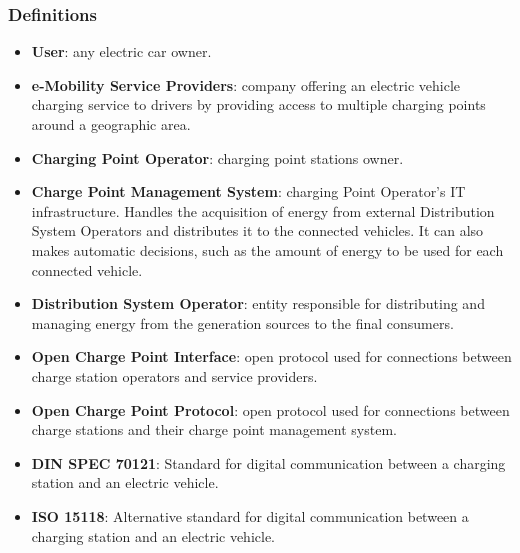 \documentclass[table, 12pt]{article} %
\begin{document}
    \subsubsection*{Definitions}
        \begin{itemize}
            \item \textbf{User}: any electric car owner.
            \item \textbf{e-Mobility Service Providers}: company offering an electric vehicle charging service to drivers by providing access to multiple charging points around a geographic area.
            \item \textbf{Charging Point Operator}: charging point stations owner.
            \item \textbf{Charge Point Management System}: charging Point Operator's IT infrastructure. Handles the acquisition of energy from external Distribution System Operators and distributes it to the connected vehicles. It can also makes automatic decisions, such as the amount of energy to be used for each connected vehicle.
            \item \textbf{Distribution System Operator}: entity responsible for distributing and managing energy from the generation sources to the final consumers.
            \item \textbf{Open Charge Point Interface}: open protocol used for connections between charge station operators and service providers.
            \item \textbf{Open Charge Point Protocol}: open protocol used for connections between charge stations and their charge point management system.
            \item \textbf{DIN SPEC 70121}: Standard for digital communication between a charging station and an electric vehicle.
            \item \textbf{ISO 15118}: Alternative standard for digital communication between a charging station and an electric vehicle.
        \end{itemize}
\end{document}

